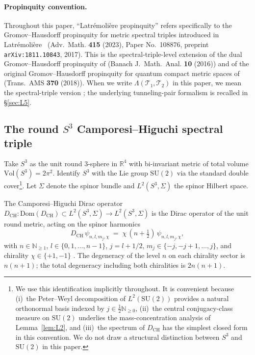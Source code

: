 \documentclass[11pt,a4paper]{article}
\theoremstyle{plain}
\theoremstyle{definition}
\newcommand{\sthree}{S^{3}}
\newcommand{\Tcal}{\mathcal{T}}
\newcommand{\R}{\mathbb{R}}
\newcommand{\N}{\mathbb{N}}
\newcommand{\SU}{\mathrm{SU}}
\newcommand{\Vol}{\mathrm{Vol}}
\newcommand{\DCH}{D_{\mathrm{CH}}}
\begin{document}
\paragraph{Propinquity convention.}
Throughout this paper, ``Latr\'emoli\`ere propinquity'' refers
specifically to the Gromov--Hausdorff propinquity for metric spectral
triples introduced in Latr\'emoli\`ere~\cite{latremoliere_metric_st_2017}
(Adv.~Math. \textbf{415} (2023), Paper No.~108876, preprint
\texttt{arXiv:1811.10843}, 2017). This is the spectral-triple-level
extension of the dual Gromov--Hausdorff propinquity of
\cite{latremoliere2016} (Banach J.~Math.~Anal. \textbf{10} (2016))
and of the original Gromov--Hausdorff propinquity for quantum compact
metric spaces of \cite{latremoliere2018} (Trans.~AMS \textbf{370}
(2018)). When we write $\Lambda(\Tcal_1, \Tcal_2)$ in this paper, we
mean the spectral-triple version
\cite{latremoliere_metric_st_2017}; the underlying tunneling-pair
formalism is recalled in \S\ref{sec:L5}.

\subsection{The round $\sthree$ Camporesi--Higuchi spectral triple}
\label{sec:ch_triple}

Take $\sthree$ as the unit round 3-sphere in $\R^4$ with bi-invariant
metric of total volume $\Vol(\sthree) = 2\pi^2$. Identify $\sthree$
with the Lie group $\SU(2)$ via the standard double cover\footnote{We
use this identification implicitly throughout. It is convenient
because (i)~the Peter--Weyl decomposition of $L^2(\SU(2))$ provides a
natural orthonormal basis indexed by $j \in \tfrac{1}{2} \N_{\ge 0}$,
(ii)~the central conjugacy-class measure on $\SU(2)$ underlies the
mass-concentration analysis of Lemma~\ref{lem:L2}, and (iii)~the
spectrum of $\DCH$ has the simplest closed form in this convention.
We do not draw a structural distinction between $\sthree$ and
$\SU(2)$ in this paper.}. Let $\Sigma$ denote the spinor bundle and
$L^2(\sthree, \Sigma)$ the spinor Hilbert space.

The Camporesi--Higuchi Dirac operator
$\DCH: \mathrm{Dom}(\DCH) \subset L^2(\sthree, \Sigma) \to L^2(\sthree,
\Sigma)$ is the Dirac operator of the unit round metric, acting on
the spinor harmonics
\begin{equation}\label{eq:CH_spectrum}
   \DCH \, \psi_{n, l, m_j, \chi}
   \;=\; \chi\,(n + \tfrac{1}{2})\, \psi_{n, l, m_j, \chi},
\end{equation}
with $n \in \N_{\ge 1}$, $l \in \{0, 1, \ldots, n-1\}$, $j = l + 1/2$,
$m_j \in \{-j, -j+1, \ldots, j\}$, and chirality $\chi \in \{+1, -1\}$
\cite[\S 2]{camporesi_higuchi1996}. The degeneracy of the level
$n$ on each chirality sector is $n(n+1)$; the total degeneracy
including both chiralities is $2n(n+1)$.
\end{document}
